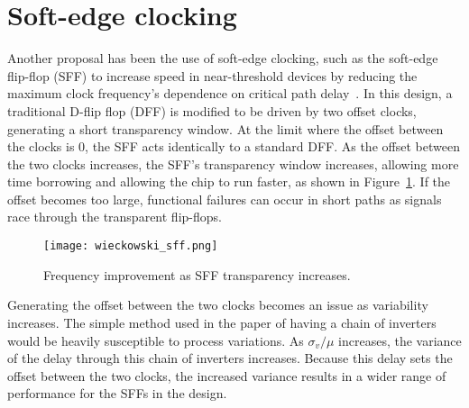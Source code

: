  \section{Soft-edge clocking}
\label{sec:softedge}

Another proposal has been the use of soft-edge clocking, such as the soft-edge flip-flop (SFF) to increase speed in near-threshold devices by reducing the maximum clock frequency's dependence on critical path delay~\cite{Wieckowski:2008bo}.
 In this design, a traditional D-flip flop (DFF) is modified to be driven by two offset clocks, generating a short transparency window.
 At the limit where the offset between the clocks is 0, the SFF acts identically to a standard DFF.
 As the offset between the two clocks increases, the SFF's transparency window increases, allowing more time borrowing and allowing the chip to run faster, as shown in Figure~\ref{fig:sff}.
 If the offset becomes too large, functional failures can occur in short paths as signals race through the transparent flip-flops. 
\begin{figure}[thpb]
    \centering
    \texttt{[image: wieckowski\_sff.png]}
    \caption{Frequency improvement as SFF transparency increases.~\cite{Wieckowski:2008bo}}
    \label{fig:sff}
\end{figure}

Generating the offset between the two clocks becomes an issue as variability increases.
 The simple method used in the paper of having a chain of inverters would be heavily susceptible to process variations.
As $\sigma_v/\mu$ increases, the variance of the delay through this chain of inverters increases.
Because this delay sets the offset between the two clocks, the increased variance results in a wider range of performance for the SFFs in the design.

